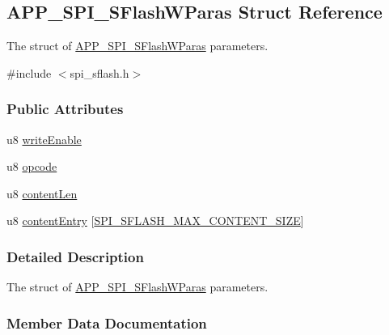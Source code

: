 \hypertarget{struct_a_p_p___s_p_i___s_flash_w_paras}{}\subsection{A\+P\+P\+\_\+\+S\+P\+I\+\_\+\+S\+Flash\+W\+Paras Struct Reference}
\label{struct_a_p_p___s_p_i___s_flash_w_paras}


The struct of \hyperlink{struct_a_p_p___s_p_i___s_flash_w_paras}{A\+P\+P\+\_\+\+S\+P\+I\+\_\+\+S\+Flash\+W\+Paras} parameters.  




{\ttfamily \#include $<$spi\+\_\+sflash.\+h$>$}

\subsubsection*{Public Attributes}
\begin{DoxyCompactItemize}
\item 
u8 \hyperlink{struct_a_p_p___s_p_i___s_flash_w_paras_a9d45b3d45f6f938d23d3cd32ddf8469e}{write\+Enable}
\item 
u8 \hyperlink{struct_a_p_p___s_p_i___s_flash_w_paras_a76f3f5856e862e5229fc23433707add6}{opcode}
\item 
u8 \hyperlink{struct_a_p_p___s_p_i___s_flash_w_paras_a40f0f54116eada6be4ee09e5a1604025}{content\+Len}
\item 
u8 \hyperlink{struct_a_p_p___s_p_i___s_flash_w_paras_aee95d3197b2d97d469d4be463f9079a6}{content\+Entry} \mbox{[}\hyperlink{group___s_p_i___s_f_l_a_s_h___m_a_x_gadea000355b05a5b9cb84744f2707b8af}{S\+P\+I\+\_\+\+S\+F\+L\+A\+S\+H\+\_\+\+M\+A\+X\+\_\+\+C\+O\+N\+T\+E\+N\+T\+\_\+\+S\+I\+ZE}\mbox{]}
\end{DoxyCompactItemize}


\subsubsection{Detailed Description}
The struct of \hyperlink{struct_a_p_p___s_p_i___s_flash_w_paras}{A\+P\+P\+\_\+\+S\+P\+I\+\_\+\+S\+Flash\+W\+Paras} parameters. 

\subsubsection{Member Data Documentation}

